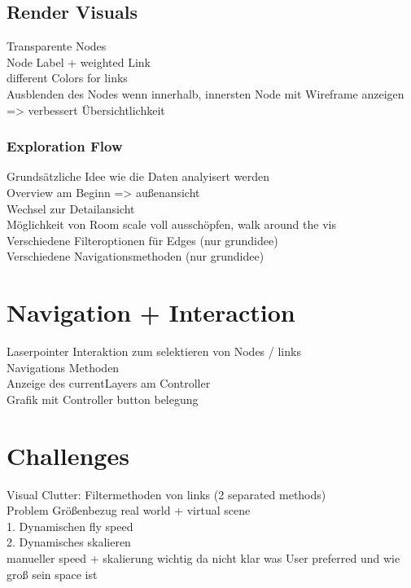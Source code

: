 \subsection{Render Visuals}

Transparente Nodes\\
Node Label + weighted Link\\
different Colors for links\\
Ausblenden des Nodes wenn innerhalb, innersten Node mit Wireframe anzeigen => verbessert Übersichtlichkeit\\

\subsubsection{Exploration Flow}

Grundsätzliche Idee wie die Daten analyisert werden\\
Overview am Beginn => außenansicht \\
Wechsel zur Detailansicht\\
Möglichkeit von Room scale voll ausschöpfen, walk around the vis\\
Verschiedene Filteroptionen für Edges (nur grundidee)\\
Verschiedene Navigationsmethoden (nur grundidee)\\

\section{Navigation + Interaction}

Laserpointer Interaktion zum selektieren von Nodes / links\\
Navigations Methoden\\
Anzeige des currentLayers am Controller\\
Grafik mit Controller button belegung\\

\section{Challenges}

Visual Clutter: Filtermethoden von links (2 separated methods)\\

Problem Größenbezug real world + virtual scene\\
1. Dynamischen fly speed\\
2. Dynamisches skalieren\\
manueller speed + skalierung wichtig da nicht klar was User preferred und wie groß sein space ist\\ 



